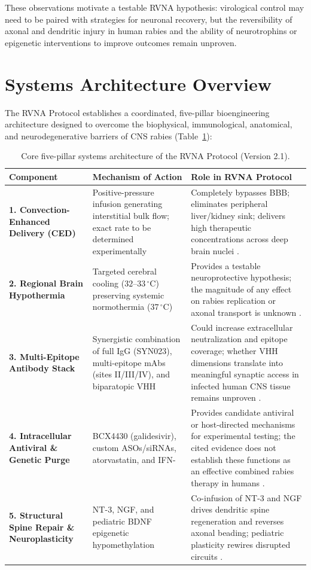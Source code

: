 \documentclass[12pt,a4paper]{article}
\begin{document}
These observations motivate a testable RVNA hypothesis: virological control may need to be paired with strategies for neuronal recovery, but the reversibility of axonal and dendritic injury in human rabies and the ability of neurotrophins or epigenetic interventions to improve outcomes remain unproven.

\section{Systems Architecture Overview}

The RVNA Protocol establishes a coordinated, five-pillar bioengineering architecture designed to overcome the biophysical, immunological, anatomical, and neurodegenerative barriers of CNS rabies (Table~\ref{tab:core_components}):

\begin{table}[htbp]
\centering
\small
\begin{tabular}{@{}p{3.2cm}p{4.8cm}p{6.5cm}@{}}
\toprule
\textbf{Component} & \textbf{Mechanism of Action} & \textbf{Role in RVNA Protocol} \\
\midrule
\textbf{1. Convection-Enhanced Delivery (CED)} & Positive-pressure infusion generating interstitial bulk flow; exact rate to be determined experimentally & Completely bypasses BBB; eliminates peripheral liver/kidney sink; delivers high therapeutic concentrations across deep brain nuclei \citep{parvar2025ced}. \\
\addlinespace
\textbf{2. Regional Brain Hypothermia} & Targeted cerebral cooling ($32\text{--}33\,^{\circ}\mathrm{C}$) preserving systemic normothermia ($37\,^{\circ}\mathrm{C}$) & Provides a testable neuroprotective hypothesis; the magnitude of any effect on rabies replication or axonal transport is unknown \citep{jackson2011therapy}. \\
\addlinespace
\textbf{3. Multi-Epitope Antibody Stack} & Synergistic combination of full IgG (SYN023), multi-epitope mAbs (sites II/III/IV), and biparatopic VHH & Could increase extracellular neutralization and epitope coverage; whether VHH dimensions translate into meaningful synaptic access in infected human CNS tissue remains unproven \citep{liu2025syn023, terryn2016vhh, ren2025synb1}. \\
\addlinespace
\textbf{4. Intracellular Antiviral \& Genetic Purge} & BCX4430 (galidesivir), custom ASOs/siRNAs, atorvastatin, and IFN-\textbeta{} & Provides candidate antiviral or host-directed mechanisms for experimental testing; the cited evidence does not establish these functions as an effective combined rabies therapy in humans \citep{xie2023bcx, zhao2022ld}. \\
\addlinespace
\textbf{5. Structural Spine Repair \& Neuroplasticity} & NT-3, NGF, and pediatric BDNF epigenetic hypomethylation & Co-infusion of NT-3 and NGF drives dendritic spine regeneration and reverses axonal beading; pediatric plasticity rewires disrupted circuits \citep{scott2008rabies, xu2023nt3, gluska2014p75, heinsberg2026bdnf}. \\
\bottomrule
\end{tabular}
\caption{Core five-pillar systems architecture of the RVNA Protocol (Version 2.1).}\label{tab:core_components}
\end{table}
\end{document}

